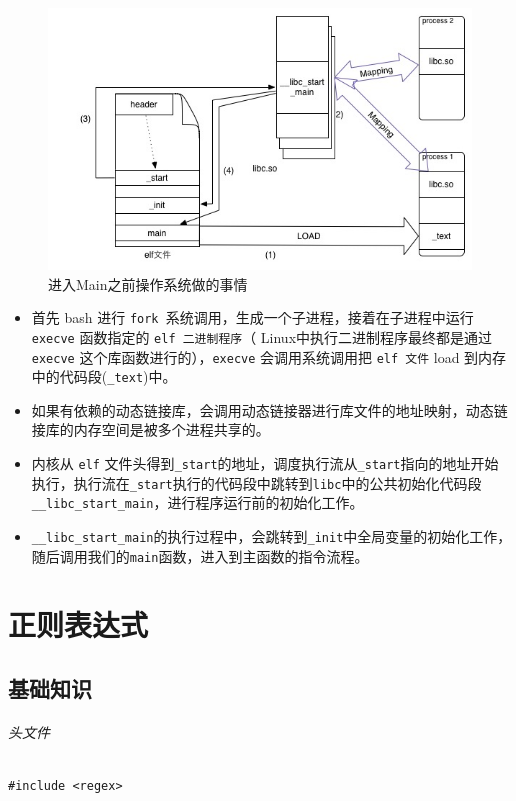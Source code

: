 \documentclass[UTF8,a4paper,12pt]{ctexbook}
\begin{document}
			\begin{figure}[htbp]
				\includegraphics[scale = 0.7]{beforeMain.jpg}
				\caption{进入Main之前操作系统做的事情}
			\end{figure}
			
			\begin{itemize}[itemindent = 1em]
				\item 首先 bash 进行 \verb|fork |系统调用，生成一个子进程，接着在子进程中运行 \verb|execve| 函数指定的 \verb|elf 二进制程序|（ Linux中执行二进制程序最终都是通过 \verb|execve| 这个库函数进行的），\verb|execve| 会调用系统调用把 \verb|elf 文件| load 到内存中的代码段(\verb|_text|)中。
				
				\item 如果有依赖的动态链接库，会调用动态链接器进行库文件的地址映射，动态链接库的内存空间是被多个进程共享的。
				
				\item 内核从 \verb|elf| 文件头得到\verb|_start|的地址，调度执行流从\verb|_start|指向的地址开始执行，执行流在\verb|_start|执行的代码段中跳转到\verb|libc|中的公共初始化代码段\verb|__libc_start_main|，进行程序运行前的初始化工作。
				
				\item \verb|__libc_start_main|的执行过程中，会跳转到\verb|_init|中全局变量的初始化工作，随后调用我们的\verb|main|函数，进入到主函数的指令流程。
			\end{itemize}

	

\chapter{正则表达式}
	\section{基础知识}
		\subparagraph{头文件} \verb|#include <regex>|
		
\end{document}
